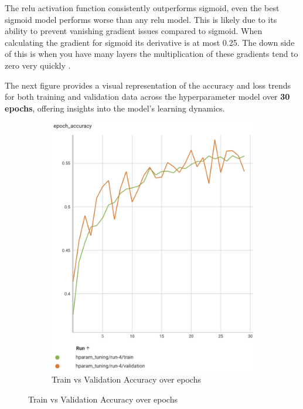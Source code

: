 The relu activation function consistently outperforms sigmoid, even the best sigmoid model performs worse than any relu model. This is likely due to its ability to prevent vanishing gradient issues compared to sigmoid. When calculating the gradient for sigmoid its derivative is at most 0.25. The down side of this is when you have many layers the multiplication of these gradients tend to zero very quickly \cite{vanishing_grad}. 

The next figure provides a visual representation of the accuracy and loss trends for both training and validation data across the hyperparameter model over \textbf{30 epochs}, offering insights into the model's learning dynamics.

\begin{figure}[H]
    \centering
    \begin{subfigure}[t]{0.35\textwidth} %
        \centering
        \includegraphics[width=\textwidth]{images/fnn_epoch_accuracy.png}
        \caption{Train vs Validation Accuracy over epochs}
        \label{fig:fnn_subfig1}
    \end{subfigure}

\end{figure}
